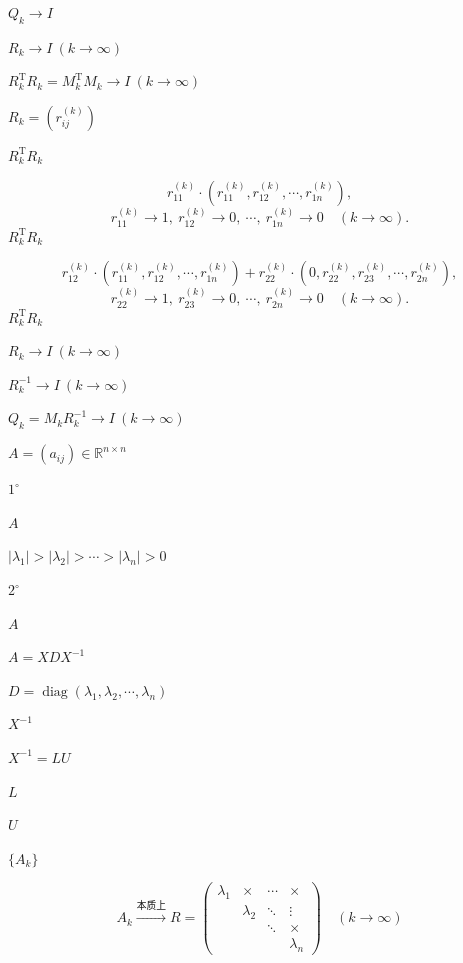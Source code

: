\documentclass[UTF8,fontset=fandol]{ctexart}
\begin{document}
$Q_k\to I$\par
$R_k\to I\ (k\to\infty)$\par
$R_k^{\mathrm T}R_k=M_k^{\mathrm T}M_k\to I\ (k\to\infty)$\par
$R_k=(r_{ij}^{(k)})$\par
$R_k^{\mathrm T}R_k$\par
\[
r_{11}^{(k)}\cdot(r_{11}^{(k)},r_{12}^{(k)},\cdots,r_{1n}^{(k)}),
\]
\[
r_{11}^{(k)}\to1,\ r_{12}^{(k)}\to0,\ \cdots,\ r_{1n}^{(k)}\to0\quad(k\to\infty).
\tag{9.4.9}
\]
$R_k^{\mathrm T}R_k$\par
\[
r_{12}^{(k)}\cdot(r_{11}^{(k)},r_{12}^{(k)},\cdots,r_{1n}^{(k)})
+r_{22}^{(k)}\cdot(0,r_{22}^{(k)},r_{23}^{(k)},\cdots,r_{2n}^{(k)}),
\]
\[
r_{22}^{(k)}\to1,\ r_{23}^{(k)}\to0,\ \cdots,\ r_{2n}^{(k)}\to0\quad(k\to\infty).
\tag{9.4.10}
\]
$R_k^{\mathrm T}R_k$\par
$R_k\to I\ (k\to\infty)$\par
$R_k^{-1}\to I\ (k\to\infty)$\par
$Q_k=M_kR_k^{-1}\to I\ (k\to\infty)$\par
$A=(a_{ij})\in\mathbb R^{n\times n}$\par
$1^\circ$\par
$A$\par
$|\lambda_1|>|\lambda_2|>\cdots>|\lambda_n|>0$\par
$2^\circ$\par
$A$\par
$A=XDX^{-1}$\par
$D=\operatorname{diag}(\lambda_1,\lambda_2,\cdots,\lambda_n)$\par
$X^{-1}$\par
$X^{-1}=LU$\par
$L$\par
$U$\par
$\{A_k\}$\par
\[
A_k\xrightarrow{\text{本质上}}R=
\begin{pmatrix}
\lambda_1&\times&\cdots&\times\\
&\lambda_2&\ddots&\vdots\\
&&\ddots&\times\\
&&&\lambda_n
\end{pmatrix}\quad(k\to\infty)
\]
\clearpage
\end{document}
